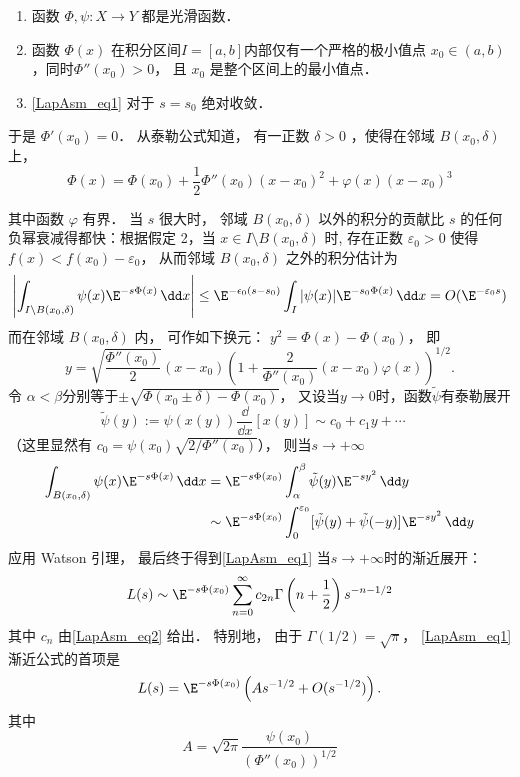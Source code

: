\begin{enumerate}
\item 函数 $\Phi,\psi:X\to Y$ 都是光滑函数．

\item 函数 $\Phi(x)$ 在积分区间$I=[a,b]$内部仅有一个严格的极小值点 $x_0\in(a,b)$，同时$\Phi''(x_0)>0$， 且 $x_0$ 是整个区间上的最小值点．

\item \autoref{LapAsm_eq1} 对于 $s=s_0$ 绝对收敛．
\end{enumerate}

于是 $\Phi'(x_0)=0$． 从泰勒公式知道， 有一正数 $\delta>0$ ，使得在邻域 $B(x_0,\delta)$ 上， 
\[
  \Phi(x)=\Phi(x_0)+\frac{1}{2}\Phi''(x_0)(x-x_0)^2+\varphi(x)(x-x_0)^3
\]

其中函数 $\varphi$ 有界． 当 $s$ 很大时， 邻域 $B(x_0,\delta)$ 以外的积分的贡献比 $s$ 的任何负幂衰减得都快：根据假定 2，当 $x\in I\setminus B(x_0,\delta)$ 时, 存在正数 $\varepsilon_0>0$ 使得 $f(x)<f(x_0)-\varepsilon_0$， 从而邻域 $B(x_0,\delta)$ 之外的积分估计为
\[
  \left|\int_{I\setminus B(x_0,\delta)}\psi(x)\E^{-s\Phi(x)}\,\dd x\right|
  \leq \E^{-\epsilon_0(s-s_0)}\int_I|\psi(x)|\E^{-s_0\Phi(x)}\,\dd x
  =O(\E^{-\varepsilon_0s})
\]
而在邻域 $B(x_0,\delta)$ 内， 可作如下换元： $y^2=\Phi(x)-\Phi(x_0)$， 即
\[
  y=\sqrt{\frac{\Phi''(x_0)}{2}}(x-x_0)\left(1+\frac{2}{\Phi''(x_0)}(x-x_0)\varphi(x)\right)^{1/2}.
\]
令 $\alpha<\beta$分别等于$\pm\sqrt{\Phi(x_0\pm\delta)-\Phi(x_0)}$， 又设当$y\to0$时，函数$\tilde{\psi}$有泰勒展开
\begin{equation}\label{LapAsm_eq2}
\tilde{\psi}(y):=\psi(x(y))\frac{\dd}{\dd x}[x(y)]\sim c_0+c_1y+\cdots \quad 
\end{equation}
（这里显然有 $c_0=\psi(x_0)\sqrt{2/\Phi''(x_0)}$）， 则当$s\to+\infty$
$$
\begin{aligned}
\int_{B(x_0,\delta)}\psi(x)\E^{-s\Phi(x)}\,\dd x
&=\E^{-s\Phi(x_0)}\int_{\alpha}^{\beta}\tilde \psi(y)\E^{-sy^2}\,\dd y\\
&\sim\E^{-s\Phi(x_0)}\int_{0}^{\varepsilon_0}[\tilde \psi(y)+\tilde \psi(-y)]\E^{-sy^2}\,\dd y
\end{aligned}
$$
应用 Watson 引理， 最后终于得到\autoref{LapAsm_eq1} 当$s\to+\infty$时的渐近展开：
\begin{equation}\label{LapAsm_eq3}
  L(s)\sim \E^{-s\Phi(x_0)}\sum_{n=0}^\infty c_{2n}\Gamma\left(n+\frac{1}{2}\right)s^{-n-1/2}
\end{equation}
其中 $c_n$ 由\autoref{LapAsm_eq2} 给出． 特别地， 由于 $\Gamma(1/2)=\sqrt{\pi}$， \autoref{LapAsm_eq1} 渐近公式的首项是
\[
L(s)=\E^{-s\Phi(x_0)}\left(As^{-1/2}+O(s^{-1/2})\right).
\]
其中
\[
  A=\sqrt{2\pi}\frac{\psi(x_0)}{(\Phi''(x_0))^{1/2}}
\]


